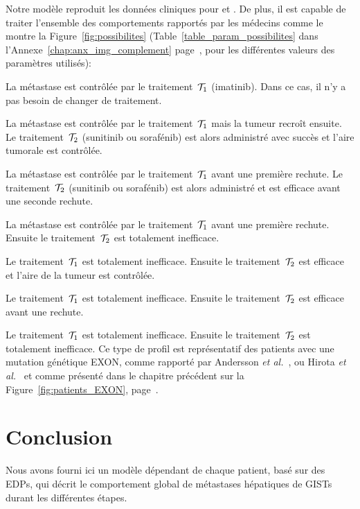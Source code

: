\documentclass[main.tex]{subfiles}
\begin{document}
Notre modèle reproduit les données cliniques pour \Nber et \Chen. De plus, il est capable de traiter l'ensemble des comportements rapportés par les médecins comme le montre la Figure~\ref{fig:possibilites} 
(\cf Table~\ref{table_param_possibilites} dans l'Annexe~\ref{chap:anx_img_complement} page~\pageref{table_param_possibilites}, pour les différentes valeurs des paramètres utilisés):
\begin{myenumerate}[label={\alph{*})}]
\item La métastase est contrôlée par le traitement~${\mathcal T_1}$ (imatinib). 
Dans ce cas, il n'y a pas besoin de changer de traitement. 
\item La métastase est contrôlée par le traitement~${\mathcal T_1}$ mais la tumeur recroît ensuite. Le traitement~${\mathcal T_2}$ (sunitinib ou sorafénib) est alors administré avec succès et l'aire tumorale est contrôlée. 
\item La métastase est contrôlée par le traitement~${\mathcal T_1}$ avant une première rechute. Le traitement~${\mathcal T_2}$ (sunitinib ou sorafénib) est alors administré et est efficace avant une seconde rechute. 
\item La métastase est contrôlée par le traitement~${\mathcal T_1}$ avant une première rechute. Ensuite le traitement~${\mathcal T_2}$ est totalement inefficace. 
\item Le traitement~${\mathcal T_1}$ est totalement inefficace. 
Ensuite le traitement~${\mathcal T_2}$ est efficace et l'aire de la tumeur est contrôlée. 
\item Le traitement~${\mathcal T_1}$ est totalement inefficace. 
Ensuite le traitement~${\mathcal T_2}$ est efficace avant une rechute.
\item Le traitement~${\mathcal T_1}$ est totalement inefficace. 
Ensuite le  traitement~${\mathcal T_2}$ est totalement inefficace. 
Ce type de profil est représentatif des patients avec une mutation génétique EXON, comme rapporté par Andersson
{\it et al.}~\cite{Andersson2006}, ou Hirota {\it et al.}~\cite{Hirota1998} et comme présenté dans le chapitre précédent sur la Figure~\ref{fig:patients_EXON}, page~\pageref{fig:patients_EXON}. 
\end{myenumerate}

\FloatBarrier
\section{Conclusion}

Nous avons fourni ici un modèle dépendant de chaque patient, basé sur des EDPs, qui décrit le comportement global de métastases hépatiques de GISTs durant les différentes étapes. 
\end{document}
